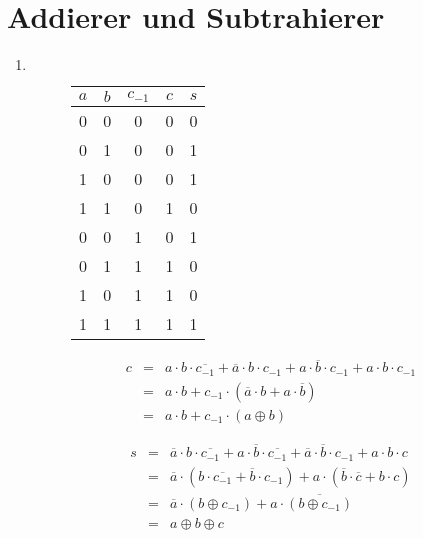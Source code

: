 \documentclass[DIN, pagenumber=false, fontsize=11pt, parskip=half]{scrartcl}
\begin{document}
    \section{Addierer und Subtrahierer}
    \begin{enumerate}[label=(\alph*)]
        \item $ $
            \begin{figure}[H]
                \centering
                \begin{tabular}{ccc|cc}
                    \toprule
                    $a$ & $b$ & $c_{-1}$ & $c$ & $s$\\
                    \midrule
                    0 & 0 & 0 & 0 & 0 \\ 
                    0 & 1 & 0 & 0 & 1 \\ 
                    1 & 0 & 0 & 0 & 1 \\ 
                    1 & 1 & 0 & 1 & 0 \\ 
                    0 & 0 & 1 & 0 & 1 \\ 
                    0 & 1 & 1 & 1 & 0 \\ 
                    1 & 0 & 1 & 1 & 0 \\ 
                    1 & 1 & 1 & 1 & 1 \\ 
                    \bottomrule
                \end{tabular}
            \end{figure}
            \begin{eqnarray*}
                c &=& a \cdot b \cdot \overline{c_{-1}} + \overline{a} \cdot b \cdot c_{-1} + a \cdot \overline{b} \cdot c_{-1} + a \cdot b \cdot c_{-1} \\
                &=& a \cdot b + c_{-1} \cdot (\overline{a} \cdot b + a \cdot \overline{b}) \\
                &=& a \cdot b + c_{-1} \cdot (a \oplus b) 
            \end{eqnarray*}

            \begin{eqnarray*}
                s &=& \overline{a} \cdot b \cdot \overline{c_{-1}} + a \cdot \overline{b} \cdot \overline{c_{-1}} + \overline{a} \cdot \overline{b} \cdot c_{-1} + a \cdot b \cdot c \\
                &=& \overline{a} \cdot (b \cdot \overline{c_{-1}} + \overline{b} \cdot c_{-1}) + a \cdot (\overline{b} \cdot \overline{c} + b \cdot c) \\
                &=& \overline{a} \cdot (b \oplus c_{-1}) + a \cdot \overline{(b \oplus c_{-1})} \\
                &=& a \oplus b \oplus c
            \end{eqnarray*}


\end{enumerate}
\end{document}
